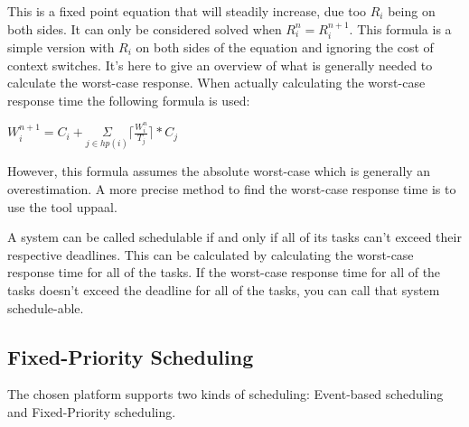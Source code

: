 This is a fixed point equation that will steadily increase, due too $R_{i}$ being on both sides. It can only be considered solved when $ R_{i}^n = R_{i}^{n+1}$. This formula is a simple version with $R_{i}$ on both sides of the equation and ignoring the cost of context switches. It's here to give an overview of what is generally needed to calculate the worst-case response.  When actually calculating the worst-case response time the following formula is used:

$W_{i}^{n+1} =  C_{i} + \underset{j\in hp(i)}{\Sigma} \lceil\frac{W_{i}^n}{T_{j}}\rceil*C_{j} $

However, this formula assumes the absolute worst-case which is generally an overestimation. A more precise method to find the worst-case response time is to use the tool uppaal.

A system can be called schedulable if and only if all of its tasks can't exceed their respective deadlines. This can be calculated by calculating the worst-case response time for all of the tasks. If the worst-case response time for all of the tasks doesn't exceed the deadline for all of the tasks, you can call that system schedule-able.\cite{roadRules}










\subsection{\textbf{Fixed-Priority Scheduling}}\label{prioratySch}
The chosen platform supports two kinds of scheduling: Event-based scheduling and Fixed-Priority scheduling\cite{OILManual}. 

